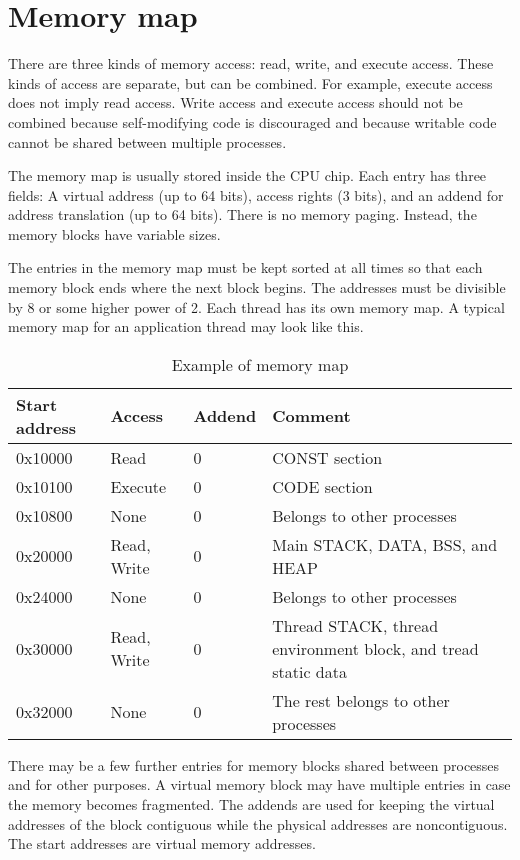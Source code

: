\documentclass[forwardcom.tex]{subfiles}
\begin{document}
\section{Memory map}
There are three kinds of memory access: read, write, and execute access. These kinds of access are separate, but can be combined. For example, execute access does not imply read access. Write access and execute access should not be combined because self-modifying code is discouraged and because writable code cannot be shared between multiple processes.
\vv

The memory map is usually stored inside the CPU chip. Each entry has three fields: A virtual address (up to 64 bits), access rights (3 bits), and an addend for address translation (up to 64 bits). There is no memory paging. Instead, the memory blocks have variable sizes.
\vv

The entries in the memory map must be kept sorted at all times so that each memory block ends where the next block begins. The addresses must be divisible by 8 or some higher power of 2. Each thread has its own memory map. A typical memory map for an application thread may look like this.

\begin{longtable} {|p{26mm}|p{24mm}|p{18mm}|p{70mm}|}
\caption{Example of memory map} \\
\endfirsthead
\endhead
\hline
\bfseries Start address & \bfseries Access & \bfseries Addend & \bfseries Comment  \\
\hline
0x10000   & Read    & 0 & CONST section \\
0x10100   & Execute & 0 & CODE section \\
0x10800   & None    & 0 & Belongs to other processes \\
0x20000   & Read, Write & 0 & Main STACK, DATA, BSS, and HEAP \\
0x24000   & None    & 0 & Belongs to other processes \\
0x30000   & Read, Write & 0 & Thread STACK, thread environment block, and tread static data \\
0x32000   & None    & 0 & The rest belongs to other processes \\
\hline
\end{longtable}

There may be a few further entries for memory blocks shared between processes and for other purposes. A virtual memory block may have multiple entries in case the memory becomes fragmented. The addends are used for keeping the virtual addresses of the block contiguous while the physical addresses are noncontiguous. The start addresses are virtual memory addresses.
\vv
\end{document}
